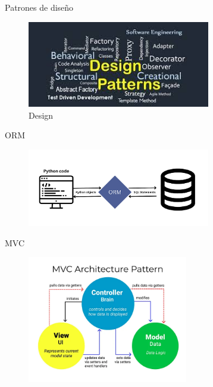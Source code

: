 \documentclass[aspectratio=169,xcolor=dvipsnames, t]{beamer}
\begin{document}

\begin{frame}{Patrones de diseño}
    \begin{figure}
    \includegraphics[width=8cm]{style_data/img/design_pattern.jpg}
    \centering
    \caption{Design}
    \end{figure}
\end{frame}




\begin{frame}{ORM}
\begin{figure}
\includegraphics[width=8cm]{style_data/img/orm.png}
\centering
\end{figure}
\end{frame}


\begin{frame}{MVC}
\begin{figure}[t]
\includegraphics[width=7cm]{style_data/img/mvc_pattern.png}
\centering
\end{figure}
\end{frame}
\end{document}
